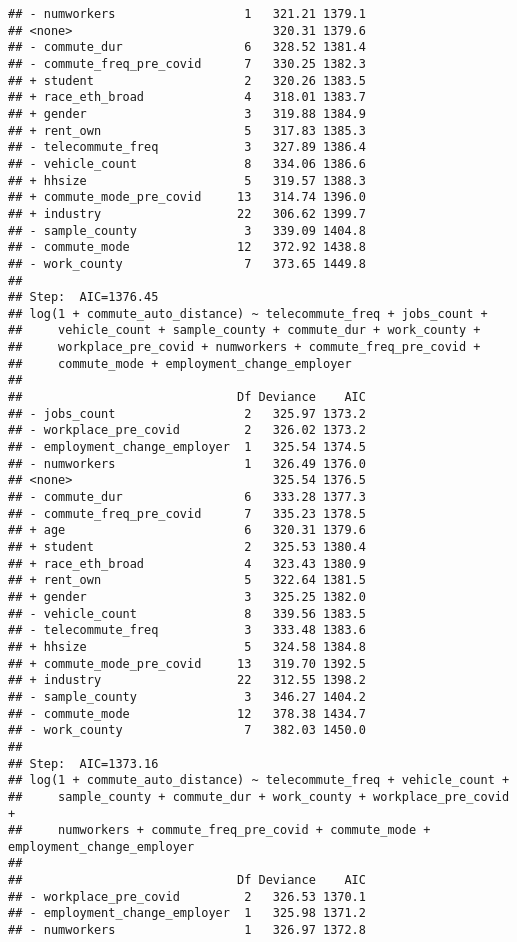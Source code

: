 \documentclass[
]{article}
\begin{document}
\begin{verbatim}
## - numworkers                  1   321.21 1379.1
## <none>                            320.31 1379.6
## - commute_dur                 6   328.52 1381.4
## - commute_freq_pre_covid      7   330.25 1382.3
## + student                     2   320.26 1383.5
## + race_eth_broad              4   318.01 1383.7
## + gender                      3   319.88 1384.9
## + rent_own                    5   317.83 1385.3
## - telecommute_freq            3   327.89 1386.4
## - vehicle_count               8   334.06 1386.6
## + hhsize                      5   319.57 1388.3
## + commute_mode_pre_covid     13   314.74 1396.0
## + industry                   22   306.62 1399.7
## - sample_county               3   339.09 1404.8
## - commute_mode               12   372.92 1438.8
## - work_county                 7   373.65 1449.8
## 
## Step:  AIC=1376.45
## log(1 + commute_auto_distance) ~ telecommute_freq + jobs_count + 
##     vehicle_count + sample_county + commute_dur + work_county + 
##     workplace_pre_covid + numworkers + commute_freq_pre_covid + 
##     commute_mode + employment_change_employer
## 
##                              Df Deviance    AIC
## - jobs_count                  2   325.97 1373.2
## - workplace_pre_covid         2   326.02 1373.2
## - employment_change_employer  1   325.54 1374.5
## - numworkers                  1   326.49 1376.0
## <none>                            325.54 1376.5
## - commute_dur                 6   333.28 1377.3
## - commute_freq_pre_covid      7   335.23 1378.5
## + age                         6   320.31 1379.6
## + student                     2   325.53 1380.4
## + race_eth_broad              4   323.43 1380.9
## + rent_own                    5   322.64 1381.5
## + gender                      3   325.25 1382.0
## - vehicle_count               8   339.56 1383.5
## - telecommute_freq            3   333.48 1383.6
## + hhsize                      5   324.58 1384.8
## + commute_mode_pre_covid     13   319.70 1392.5
## + industry                   22   312.55 1398.2
## - sample_county               3   346.27 1404.2
## - commute_mode               12   378.38 1434.7
## - work_county                 7   382.03 1450.0
## 
## Step:  AIC=1373.16
## log(1 + commute_auto_distance) ~ telecommute_freq + vehicle_count + 
##     sample_county + commute_dur + work_county + workplace_pre_covid + 
##     numworkers + commute_freq_pre_covid + commute_mode + employment_change_employer
## 
##                              Df Deviance    AIC
## - workplace_pre_covid         2   326.53 1370.1
## - employment_change_employer  1   325.98 1371.2
## - numworkers                  1   326.97 1372.8

\end{verbatim}
\end{document}

